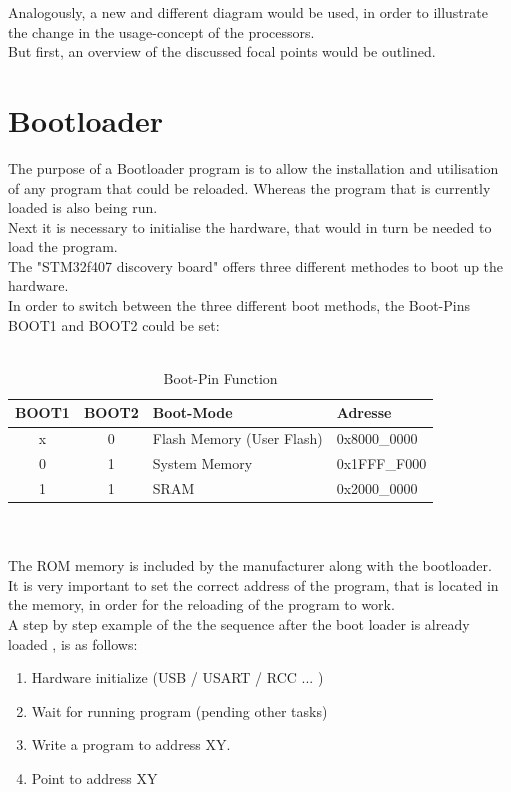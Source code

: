 Analogously, a new and different diagram would be used, in order to illustrate the 
change in the usage-concept of the processors.\\

But first, an overview of the discussed focal points would be outlined.\\  


\section{Bootloader}
The purpose of a Bootloader program is to allow the installation and utilisation 
of any program that could be reloaded. Whereas the program that is currently loaded is also being run.\\
Next it is necessary to initialise the hardware, that would in turn be needed to load the program.\\
The "STM32f407 discovery board" offers three different methodes to boot up the hardware.\\
In order to switch between the three different boot methods, the Boot-Pins BOOT1
and BOOT2 could be set:\\\\
\begin{table}
\caption{Boot-Pin Function}
\begin{tabular}{|c|c|l|l|}
\hline \hline
  BOOT1 & BOOT2 & Boot-Mode & Adresse\\ \hline
  x & 0 & Flash Memory (User Flash) & 0x8000\_0000\\
\hline
  0 & 1 & System Memory & 0x1FFF\_F000\\
\hline
 1  & 1 & SRAM & 0x2000\_0000\\
\hline
\end{tabular}
\end{table}\\\\

The ROM memory is included by the manufacturer along with the bootloader.\\
It is very important to set the correct address of the program, that is located 
in the memory, in order for the reloading of the program to work.\\
A step by step example of the the sequence after the boot loader is already 
loaded , is as follows:

\begin{enumerate}
\item Hardware initialize (USB / USART / RCC ... )
\item Wait for running program (pending other tasks)
\item Write a program to address XY.
\item Point to address XY
\end{enumerate}

